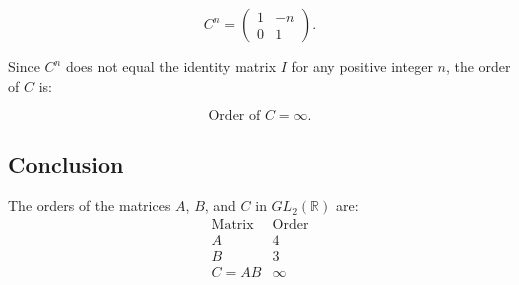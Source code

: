\documentclass[12pt]{amsart}
\theoremstyle{definition}
\numberwithin{equation}{section}
\newcommand{\R}{\mathbb{R}}
\begin{document}
\begin{exercise}{5}
    \[
    C^n = \begin{pmatrix} 1 & -n \\ 0 & 1 \end{pmatrix}.
    \]
    
    Since \(C^n\) does not equal the identity matrix \(I\) for any positive integer \(n\), the order of \(C\) is:
    
    \[
    \text{Order of } C = \infty.
    \]
    
    \subsection*{Conclusion}
    
    The orders of the matrices \(A\), \(B\), and \(C\) in \(GL_2(\R)\) are:
    \[
    \begin{array}{c|c}
    \text{Matrix} & \text{Order} \\
    \hline
    A & 4 \\
    B & 3 \\
    C = AB & \infty \\
    \end{array}
    \]
    
    \end{exercise}
    \newpage
    
\end{document}
